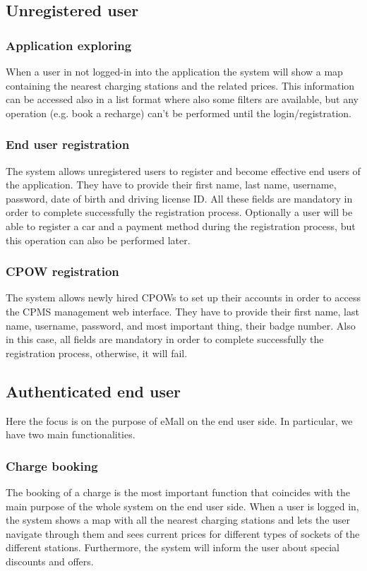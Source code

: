 \documentclass[a4paper]{report}
\begin{document}
\subsection{Unregistered user}

\subsubsection{Application exploring}
When a user in not logged-in into the application the system will show a map containing the nearest charging stations and the related prices. This information can be accessed also in a list format where also some filters are available, but any operation (e.g. book a recharge) can't be performed until the login/registration.

\subsubsection{End user registration}
The system allows unregistered users to register and become effective end users of the application. They have to provide their first name, last name, username, password, date of birth and driving license ID. All these fields are mandatory in order to complete successfully the registration process. Optionally a user will be able to register a car and a payment method during the registration process, but this operation can also be performed later.

\subsubsection{CPOW registration}
The system allows newly hired CPOWs to set up their accounts in order to access the CPMS management web interface. They have to provide their first name, last name, username, password, and most important thing, their badge number. Also in this case, all fields are mandatory in order to complete successfully the registration process, otherwise, it will fail.

\subsection{Authenticated end user}
Here the focus is on the purpose of eMall on the end user side. In particular, we have two main functionalities.
\subsubsection{Charge booking}
The booking of a charge is the most important function that coincides with the main purpose of the whole system on the end user side. When a user is logged in, the system shows a map with all the nearest charging stations and lets the user navigate through them and sees current prices for different types of sockets of the different stations. Furthermore, the system will inform the user about special discounts and offers.
\end{document}
